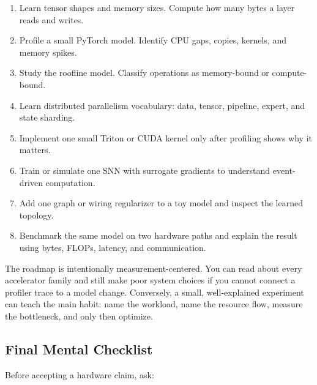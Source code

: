 \begin{enumerate}[leftmargin=*]
  \item Learn tensor shapes and memory sizes. Compute how many bytes a layer reads and writes.
  \item Profile a small PyTorch model. Identify CPU gaps, copies, kernels, and memory spikes.
  \item Study the roofline model. Classify operations as memory-bound or compute-bound.
  \item Learn distributed parallelism vocabulary: data, tensor, pipeline, expert, and state sharding.
  \item Implement one small Triton or CUDA kernel only after profiling shows why it matters.
  \item Train or simulate one SNN with surrogate gradients to understand event-driven computation.
  \item Add one graph or wiring regularizer to a toy model and inspect the learned topology.
  \item Benchmark the same model on two hardware paths and explain the result using bytes, FLOPs, latency, and communication.
\end{enumerate}

The roadmap is intentionally measurement-centered. You can read about every accelerator family and still make poor system choices if you cannot connect a profiler trace to a model change. Conversely, a small, well-explained experiment can teach the main habit: name the workload, name the resource flow, measure the bottleneck, and only then optimize.

\subsection{Final Mental Checklist}

Before accepting a hardware claim, ask:

